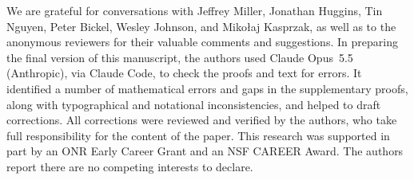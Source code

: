 We are grateful for conversations with Jeffrey Miller, Jonathan Huggins, Tin
Nguyen, Peter Bickel, Wesley Johnson, and Miko\l{}aj Kasprzak, as well as to the
anonymous reviewers for their valuable comments and suggestions.   In preparing
the final version of this manuscript, the authors used Claude Opus~5.5
(Anthropic), via Claude Code, to check the proofs and text for errors. It
identified a number of mathematical errors and gaps in the supplementary proofs,
along with typographical and notational inconsistencies, and helped to draft
corrections.  All corrections were reviewed and verified by the authors, who
take full responsibility for the content of the paper. This research was
supported in part by an ONR Early Career Grant and an NSF CAREER Award.
The authors report there are no competing interests to declare.